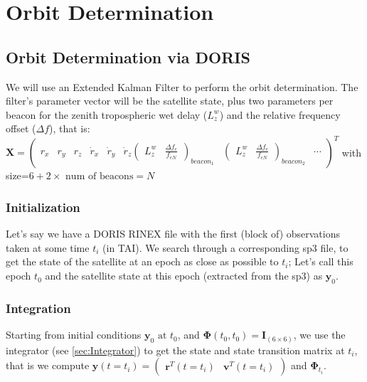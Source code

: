 \chapter{Orbit Determination}
\label{ch:orbit-determination}

\section{Orbit Determination via DORIS}
\label{sec:pod}

We will use an Extended Kalman Filter to perform the orbit determination. The 
filter's parameter vector will be the satellite state, plus two parameters per 
beacon for the zenith tropospheric wet delay ($L^w_z$) and the relative frequency 
offset ($\Delta f$), that is:
$\bm{X}=
    \begin{pmatrix}
        r_x & r_y & r_z & \dot{r}_x & \dot{r}_y & \dot{r}_z 
        \begin{pmatrix} L^w_z & \frac{\Delta f_e}{f_{eN}} \end{pmatrix}_{beacon_1} & 
        \begin{pmatrix} L^w_z & \frac{\Delta f_e}{f_{eN}} \end{pmatrix}_{beacon_2} &
        \cdots 
    \end{pmatrix}^T$
with size=$6+2 \times \text{ num of beacons} = N$

\subsection{Initialization} \label{ssec:Initialization}
Let's say we have a DORIS RINEX file with the first (block of) observations 
taken at some time $t_i$ (in TAI). We search through a corresponding sp3 file, 
to get the state of the satellite at an epoch as close as possible to $t_i$; 
Let's call this epoch $t_0$ and the satellite state at this epoch (extracted 
from the sp3) as $\bm{y}_0$.

\subsection{Integration} \label{ssec:integration}
Starting from initial conditions $\bm{y}_0 \text{ at } t_0$, and 
$\bm{\Phi} (t_0,t_0) = \bm{I}_{(6 \times 6)}$, we use the integrator 
(see \ref{sec:Integrator}) to get the state and state transition matrix at $t_i$, 
that is we compute 
$\bm{y}(t=t_i) = \begin{pmatrix} \bm{r}^T(t=t_i) & \bm{v}^T(t=t_i) \end{pmatrix}$ 
and $\bm{\Phi} _{t_i}$.

